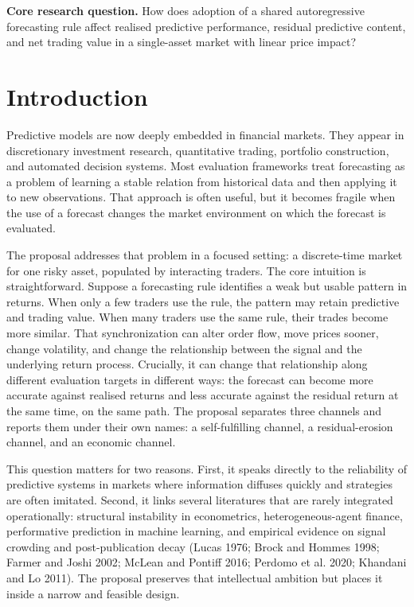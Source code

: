 \documentclass[11pt]{article}
\begin{document}
\begin{callout}
\textbf{Core research question.} How does adoption of a shared autoregressive forecasting rule affect realised predictive performance, residual predictive content, and net trading value in a single-asset market with linear price impact?
\end{callout}


\section{Introduction}

Predictive models are now deeply embedded in financial markets. They appear in discretionary investment research, quantitative trading, portfolio construction, and automated decision systems. Most evaluation frameworks treat forecasting as a problem of learning a stable relation from historical data and then applying it to new observations. That approach is often useful, but it becomes fragile when the use of a forecast changes the market environment on which the forecast is evaluated.

The proposal addresses that problem in a focused setting: a discrete-time market for one risky asset, populated by interacting traders. The core intuition is straightforward. Suppose a forecasting rule identifies a weak but usable pattern in returns. When only a few traders use the rule, the pattern may retain predictive and trading value. When many traders use the same rule, their trades become more similar. That synchronization can alter order flow, move prices sooner, change volatility, and change the relationship between the signal and the underlying return process. Crucially, it can change that relationship along different evaluation targets in different ways: the forecast can become more accurate against realised returns and less accurate against the residual return at the same time, on the same path. The proposal separates three channels and reports them under their own names: a self-fulfilling channel, a residual-erosion channel, and an economic channel.

This question matters for two reasons. First, it speaks directly to the reliability of predictive systems in markets where information diffuses quickly and strategies are often imitated. Second, it links several literatures that are rarely integrated operationally: structural instability in econometrics, heterogeneous-agent finance, performative prediction in machine learning, and empirical evidence on signal crowding and post-publication decay (Lucas 1976; Brock and Hommes 1998; Farmer and Joshi 2002; McLean and Pontiff 2016; Perdomo et al. 2020; Khandani and Lo 2011). The proposal preserves that intellectual ambition but places it inside a narrow and feasible design.
\end{document}
